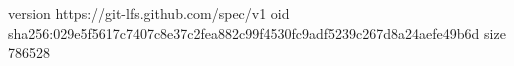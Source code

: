 version https://git-lfs.github.com/spec/v1
oid sha256:029e5f5617c7407c8e37c2fea882c99f4530fc9adf5239c267d8a24aefe49b6d
size 786528
